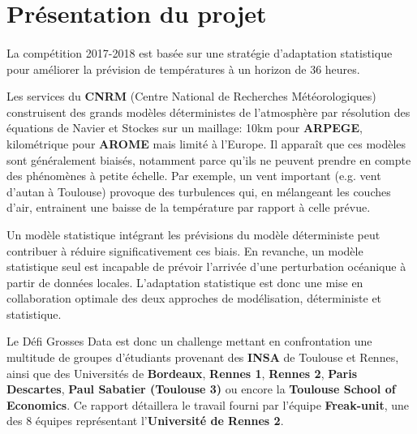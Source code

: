 \documentclass[14pt, openany]{article}
\begin{document}
\renewcommand{\contentsname}{Plan}

\tableofcontents
\newpage

\section{Présentation du projet}
\paragraph{}
La compétition 2017-2018 est basée sur une stratégie d'adaptation statistique pour améliorer la prévision de températures à un horizon de 36 heures.

Les services du \textbf{CNRM} (Centre National de Recherches Météorologiques) construisent des grands modèles déterministes de l'atmosphère par résolution des équations de Navier et Stockes sur un maillage: 10km pour \textbf{ARPEGE}, kilométrique pour \textbf{AROME} mais limité à l'Europe. Il apparaît que ces modèles sont généralement biaisés, notamment parce qu'ils ne peuvent prendre en compte des phénomènes à petite échelle. Par exemple, un vent important (e.g. vent d'autan à Toulouse) provoque des turbulences qui, en mélangeant les couches d'air, entrainent une baisse de la température par rapport à celle prévue.

Un modèle statistique intégrant les prévisions du modèle déterministe peut contribuer à réduire significativement ces biais. En revanche, un modèle statistique seul est incapable de prévoir l'arrivée d'une perturbation océanique à partir de données locales. L'adaptation statistique est donc une mise en collaboration \og optimale \fg{} des deux approches de modélisation, déterministe et statistique.

Le \og Défi Grosses Data \fg{} est donc un challenge mettant en confrontation une multitude de groupes d'étudiants provenant des \textbf{INSA} de Toulouse et Rennes, ainsi que des Universités de \textbf{Bordeaux}, \textbf{Rennes 1}, \textbf{Rennes 2}, \textbf{Paris Descartes}, \textbf{Paul Sabatier (Toulouse 3)} ou encore la \textbf{Toulouse School of Economics}. Ce rapport détaillera le travail fourni par l'équipe \textbf{Freak-unit}, une des 8 équipes représentant l'\textbf{Université de Rennes 2}.
\end{document}
